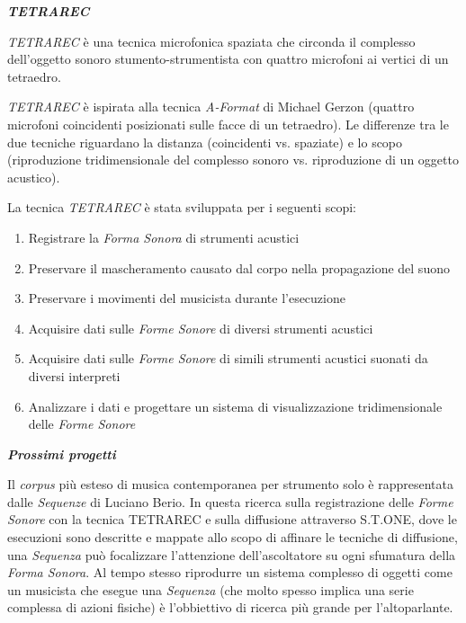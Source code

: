 
\noindent \textit{\textbf{TETRAREC}}

\smallskip

\noindent \emph{TETRAREC} è una tecnica microfonica spaziata che circonda il complesso dell'oggetto sonoro stumento-strumentista con quattro microfoni ai vertici di un tetraedro.

\noindent  \emph{TETRAREC} è ispirata alla tecnica \emph{A-Format} di  Michael Gerzon
(quattro microfoni coincidenti posizionati sulle facce di un tetraedro). Le differenze tra le due tecniche riguardano la distanza (coincidenti vs. spaziate) e lo scopo (riproduzione tridimensionale del complesso sonoro vs.  riproduzione di un oggetto acustico).

\noindent La tecnica \emph{TETRAREC} è stata sviluppata per i seguenti scopi:

\begin{enumerate}
\item Registrare la \emph{Forma Sonora} di strumenti acustici
\item Preservare il mascheramento causato dal corpo nella propagazione del suono
\item Preservare i movimenti del musicista durante l'esecuzione
\item Acquisire dati sulle \emph{Forme Sonore} di diversi strumenti acustici
\item Acquisire dati sulle \emph{Forme Sonore} di simili strumenti acustici suonati da diversi interpreti
\item Analizzare i dati e progettare un sistema di visualizzazione tridimensionale delle \emph{Forme Sonore}
\end{enumerate}

\vspace{1cm}

\noindent \textit{\textbf{Prossimi progetti}}

\smallskip

\noindent Il \emph{corpus} più esteso di musica contemporanea per strumento solo è rappresentata dalle \emph{Sequenze} di Luciano Berio. 
In questa ricerca sulla registrazione delle \emph{Forme Sonore} con la tecnica TETRAREC e sulla diffusione attraverso S.T.ONE, dove le esecuzioni sono descritte e mappate allo scopo di affinare le tecniche di diffusione, una \emph{Sequenza} può focalizzare l'attenzione dell'ascoltatore su ogni sfumatura della \emph{Forma Sonora}. Al tempo stesso riprodurre un sistema complesso di oggetti come un musicista che esegue una \emph{Sequenza} (che molto spesso implica  una serie complessa di azioni  fisiche) è l'obbiettivo di ricerca più grande per l'altoparlante.

